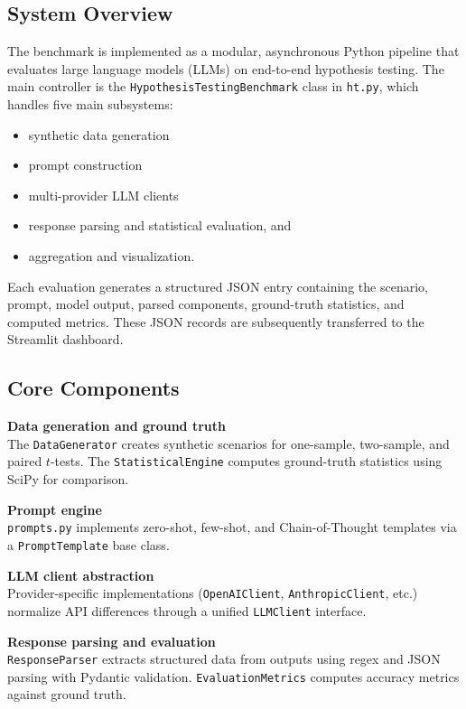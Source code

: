 \documentclass{article}
\begin{document}
\subsection{System Overview}

The benchmark is implemented as a modular, asynchronous Python pipeline that evaluates large language models (LLMs) on end-to-end hypothesis testing. The main controller is the \texttt{HypothesisTestingBenchmark} class in \texttt{ht.py}, which handles five main subsystems: 
\begin{itemize}
    \item synthetic data generation
    \item prompt construction
    \item multi-provider LLM clients
    \item response parsing and statistical evaluation, and
    \item aggregation and visualization.
\end{itemize}
Each evaluation generates a structured JSON entry containing the scenario, prompt, model output, parsed components, ground-truth statistics, and computed metrics. These JSON records are subsequently transferred to the Streamlit dashboard.

\subsection{Core Components}

\textbf{Data generation and ground truth} \\
The \texttt{DataGenerator} creates synthetic scenarios for one-sample, two-sample, and paired $t$-tests. The \texttt{StatisticalEngine} computes ground-truth statistics using SciPy for comparison.

\textbf{Prompt engine}\\
\texttt{prompts.py} implements zero-shot, few-shot, and Chain-of-Thought templates via a \texttt{PromptTemplate} base class.

\textbf{LLM client abstraction}\\
Provider-specific implementations (\texttt{OpenAIClient}, \texttt{AnthropicClient}, etc.) normalize API differences through a unified \texttt{LLMClient} interface.

\textbf{Response parsing and evaluation}\\
\texttt{ResponseParser} extracts structured data from outputs using regex and JSON parsing with Pydantic validation. \texttt{EvaluationMetrics} computes accuracy metrics against ground truth.
\end{document}
